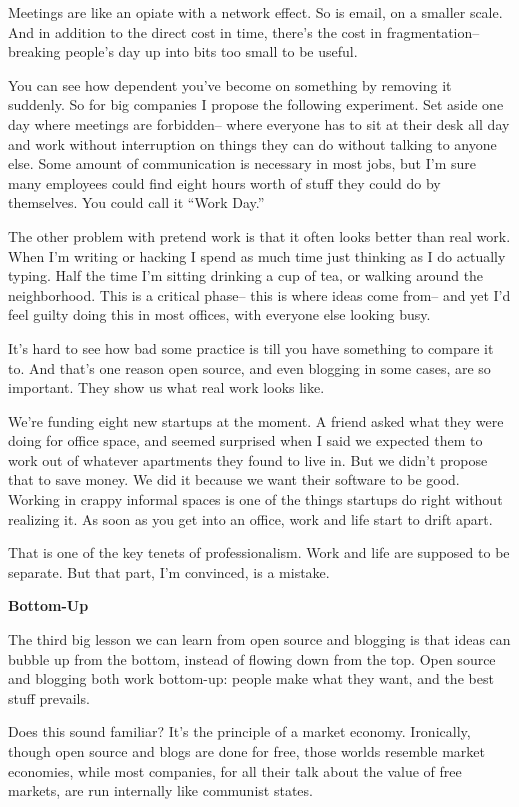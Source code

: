 Meetings are like an opiate with a network effect. So is email, on a
smaller scale. And in addition to the direct cost in time, there's the
cost in fragmentation-- breaking people's day up into bits too small to
be useful.

You can see how dependent you've become on something by removing it
suddenly. So for big companies I propose the following experiment. Set
aside one day where meetings are forbidden-- where everyone has to sit
at their desk all day and work without interruption on things they can
do without talking to anyone else. Some amount of communication is
necessary in most jobs, but I'm sure many employees could find eight
hours worth of stuff they could do by themselves. You could call it
``Work Day.''

The other problem with pretend work is that it often looks better than
real work. When I'm writing or hacking I spend as much time just
thinking as I do actually typing. Half the time I'm sitting drinking a
cup of tea, or walking around the neighborhood. This is a critical
phase-- this is where ideas come from-- and yet I'd feel guilty doing
this in most offices, with everyone else looking busy.

It's hard to see how bad some practice is till you have something to
compare it to. And that's one reason open source, and even blogging in
some cases, are so important. They show us what real work looks like.

We're funding eight new startups at the moment. A friend asked what they
were doing for office space, and seemed surprised when I said we
expected them to work out of whatever apartments they found to live in.
But we didn't propose that to save money. We did it because we want
their software to be good. Working in crappy informal spaces is one of
the things startups do right without realizing it. As soon as you get
into an office, work and life start to drift apart.

That is one of the key tenets of professionalism. Work and life are
supposed to be separate. But that part, I'm convinced, is a mistake.

\textbf{Bottom-Up}

The third big lesson we can learn from open source and blogging is that
ideas can bubble up from the bottom, instead of flowing down from the
top. Open source and blogging both work bottom-up: people make what they
want, and the best stuff prevails.

Does this sound familiar? It's the principle of a market economy.
Ironically, though open source and blogs are done for free, those worlds
resemble market economies, while most companies, for all their talk
about the value of free markets, are run internally like communist
states.

